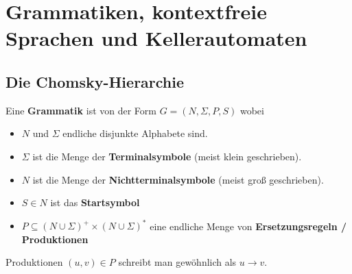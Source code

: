 
\chapter{Grammatiken, kontextfreie Sprachen und Kellerautomaten}

\section{Die Chomsky-Hierarchie}

\begin{definition}\label{def6.2}
	Eine \textbf{Grammatik} ist von der Form $G=(N,\Sigma,P,S)$ wobei
	\begin{itemize}
		\item $N$ und $\Sigma$ endliche disjunkte Alphabete sind.
		\item $\Sigma$ ist die Menge der \textbf{Terminalsymbole} (meist klein geschrieben).
		\item $N$ ist die Menge der \textbf{Nichtterminalsymbole} (meist groß geschrieben).
		\item $S\in N$ ist das \textbf{Startsymbol}
		\item $P\subseteq(N\cup\Sigma)^+\times(N\cup\Sigma)^\ast$ eine endliche Menge von \textbf{Ersetzungsregeln / Produktionen}
	\end{itemize}
	Produktionen $(u,v)\in P$ schreibt man gewöhnlich als $u\to v$.
\end{definition}

